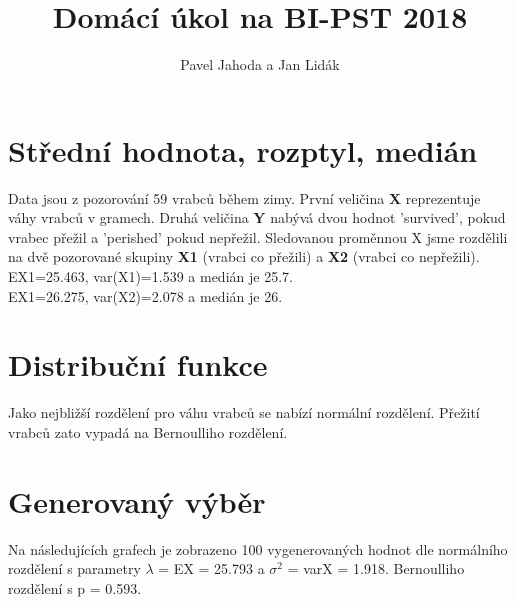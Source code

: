 \documentclass[12pt,a4paper]{article}
\begin{document}
\title{\LARGE \bf Domácí úkol na BI-PST 2018}
 \author{Pavel Jahoda a Jan Lidák}

\maketitle

\section{Střední hodnota, rozptyl, medián}
Data jsou z pozorování 59 vrabců během zimy. První veličina {\bf X} reprezentuje váhy vrabců v gramech. Druhá veličina {\bf Y} nabývá dvou hodnot 'survived', pokud vrabec přežil a 'perished' pokud nepřežil. Sledovanou proměnnou X jsme rozdělili na dvě pozorované skupiny {\bf X1} (vrabci co přežili) a {\bf X2} (vrabci co nepřežili).\\
EX1=25.463, var(X1)=1.539 a medián je 25.7.\\
EX1=26.275, var(X2)=2.078 a medián je 26.\\
\par \bigskip

\section{Distribuční funkce}
Jako nejbližší rozdělení pro váhu vrabců se nabízí normální rozdělení. Přežití vrabců zato vypadá na Bernoulliho rozdělení.\\

\section{Generovaný výběr}
Na následujících grafech je zobrazeno 100 vygenerovaných hodnot dle normálního rozdělení s parametry $\lambda$ = EX = 25.793 a $\sigma ^2$ = varX = 1.918. Bernoulliho rozdělení s p = 0.593.
\end{document}
